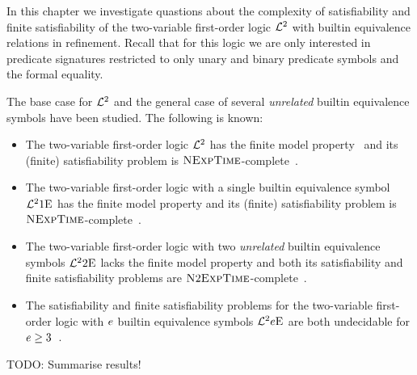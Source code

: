 In this chapter we investigate quastions about the complexity of satisfiability
and finite satisfiability of the two-variable first-order logic $\mathcal{L}^{2}$ with
builtin equivalence relations in refinement. Recall that for this logic we are
only interested in predicate signatures restricted to only unary and binary
predicate symbols and the formal equality.

The base case for $\mathcal{L}^{2}$ and the general case of several \emph{unrelated}
builtin equivalence symbols have been studied. The following is known:
\begin{itemize}
  \item The two-variable first-order logic $\mathcal{L}^{2}$ has the finite model
  property~\cite{MALQ:MALQ19750210118} and its (finite) satisfiability problem
  is $\text{\normalfont{\scshape NExpTime}}$-complete~\cite{gradel1997decision}.
  \item The two-variable first-order logic with a single builtin equivalence
  symbol $\mathcal{L}^{2}{1}\mathrm{E}_{{}}$ has the finite model property and its (finite)
  satisfiability problem is $\text{\normalfont{\scshape NExpTime}}$-complete~\cite{kieronski2005results}.
  \item The two-variable first-order logic with two \emph{unrelated} builtin
  equivalence symbols $\mathcal{L}^{2}{2}\mathrm{E}_{{}}$ lacks the finite model property and both
  its satisfiability and finite satisfiability problems are
  $\text{\normalfont{\scshape N}}2\text{\normalfont{\scshape ExpTime}}$-complete~\cite{doi:10.1137/120900095}.
  \item The satisfiability and finite satisfiability problems for
  the two-variable first-order logic with $e$ builtin equivalence symbols
  $\mathcal{L}^{2}{e}\mathrm{E}_{{}}$ are both undecidable for $e \geq
  3$~\cite{kieronski2005small}.
\end{itemize}
TODO: Summarise results!
